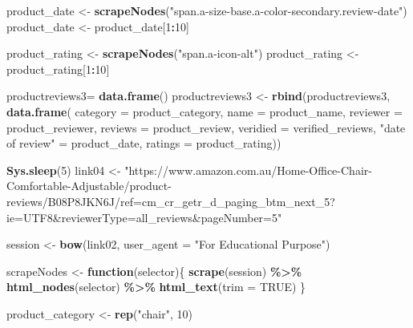 \documentclass[
]{article}
\newenvironment{Shaded}{\begin{snugshade}}{\end{snugshade}}
\newcommand{\AttributeTok}[1]{\textcolor[rgb]{0.13,0.29,0.53}{#1}}
\newcommand{\ConstantTok}[1]{\textcolor[rgb]{0.56,0.35,0.01}{#1}}
\newcommand{\ControlFlowTok}[1]{\textcolor[rgb]{0.13,0.29,0.53}{\textbf{#1}}}
\newcommand{\DecValTok}[1]{\textcolor[rgb]{0.00,0.00,0.81}{#1}}
\newcommand{\FunctionTok}[1]{\textcolor[rgb]{0.13,0.29,0.53}{\textbf{#1}}}
\newcommand{\NormalTok}[1]{#1}
\newcommand{\OtherTok}[1]{\textcolor[rgb]{0.56,0.35,0.01}{#1}}
\newcommand{\SpecialCharTok}[1]{\textcolor[rgb]{0.81,0.36,0.00}{\textbf{#1}}}
\newcommand{\StringTok}[1]{\textcolor[rgb]{0.31,0.60,0.02}{#1}}
\begin{document}
\begin{Shaded}
\begin{Highlighting}[]
\NormalTok{  product\_date }\OtherTok{\textless{}{-}} \FunctionTok{scrapeNodes}\NormalTok{(}\StringTok{"span.a{-}size{-}base.a{-}color{-}secondary.review{-}date"}\NormalTok{)}
\NormalTok{  product\_date }\OtherTok{\textless{}{-}}\NormalTok{ product\_date[}\DecValTok{1}\SpecialCharTok{:}\DecValTok{10}\NormalTok{]}
  
\NormalTok{  product\_rating }\OtherTok{\textless{}{-}} \FunctionTok{scrapeNodes}\NormalTok{(}\StringTok{"span.a{-}icon{-}alt"}\NormalTok{)}
\NormalTok{  product\_rating }\OtherTok{\textless{}{-}}\NormalTok{ product\_rating[}\DecValTok{1}\SpecialCharTok{:}\DecValTok{10}\NormalTok{]}
  
\NormalTok{  productreviews3}\OtherTok{=} \FunctionTok{data.frame}\NormalTok{()}
\NormalTok{  productreviews3 }\OtherTok{\textless{}{-}} \FunctionTok{rbind}\NormalTok{(productreviews3, }\FunctionTok{data.frame}\NormalTok{(}
                      \AttributeTok{category =}\NormalTok{ product\_category,}
                      \AttributeTok{name =}\NormalTok{ product\_name,}
                      \AttributeTok{reviewer =}\NormalTok{ product\_reviewer,}
                      \AttributeTok{reviews =}\NormalTok{ product\_review,}
                      \AttributeTok{veridied =}\NormalTok{ verified\_reviews,}
                      \StringTok{"date of review"} \OtherTok{=}\NormalTok{ product\_date,}
                      \AttributeTok{ratings =}\NormalTok{ product\_rating))}
  
   \FunctionTok{Sys.sleep}\NormalTok{(}\DecValTok{5}\NormalTok{)}
\NormalTok{link04 }\OtherTok{\textless{}{-}} \StringTok{"https://www.amazon.com.au/Home{-}Office{-}Chair{-}Comfortable{-}Adjustable/product{-}reviews/B08P8JKN6J/ref=cm\_cr\_getr\_d\_paging\_btm\_next\_5?ie=UTF8\&reviewerType=all\_reviews\&pageNumber=5"}


\NormalTok{  session }\OtherTok{\textless{}{-}} \FunctionTok{bow}\NormalTok{(link02,}
               \AttributeTok{user\_agent =} \StringTok{"For Educational Purpose"}\NormalTok{)}

\NormalTok{  scrapeNodes }\OtherTok{\textless{}{-}} \ControlFlowTok{function}\NormalTok{(selector)\{}
    \FunctionTok{scrape}\NormalTok{(session) }\SpecialCharTok{\%\textgreater{}\%}
      \FunctionTok{html\_nodes}\NormalTok{(selector) }\SpecialCharTok{\%\textgreater{}\%}
      \FunctionTok{html\_text}\NormalTok{(}\AttributeTok{trim =} \ConstantTok{TRUE}\NormalTok{)}
\NormalTok{  \}}

\NormalTok{  product\_category }\OtherTok{\textless{}{-}} \FunctionTok{rep}\NormalTok{(}\StringTok{"chair"}\NormalTok{, }\DecValTok{10}\NormalTok{)}


\end{Highlighting}
\end{Shaded}
\end{document}
